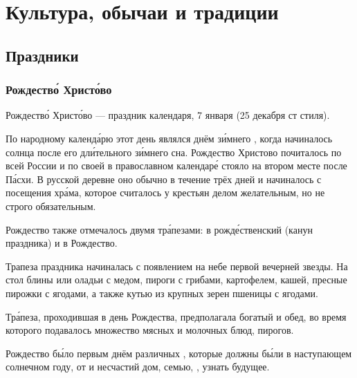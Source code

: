 \chapter{Культура, обычаи и традиции}

\section{Праздники}
\subsection{Рождеств\'{о} Христ\'{о}во}
Рождеств\'{о} Христ\'{о}во --- праздник  календаря,  7 января (25 декабря ст стиля).

По народному календ\'{а}рю этот день являлся днём з\'{и}мнего , когда начиналось  солнца после его дл\'{и}тельного з\'{и}мнего сна. Рождество Христово почиталось по всей России и по своей  в православном календар\'{е} стояло на втором месте после П\'{а}схи. В русской деревне оно  обычно в течение трёх дней и начиналось с посещения хр\'{а}ма, которое считалось у крестьян делом желательным, но не строго обязательным.

Рождество также отмечалось двумя тр\'{а}пезами: в рожд\'{е}ственский  (канун праздника) и  в Рождество.

Трапеза  праздника начиналась с появлением на небе первой вечерней звезды. На стол  блины или оладьи с медом,  пироги с грибами, картофелем, кашей, пресные пирожки с ягодами, а также кутью из крупных зерен пшеницы с ягодами.

Тр\'{а}пеза, проходившая в день Рождества, предполагала богатый и  обед, во время которого подавалось множество мясных и молочных блюд, пирогов.

Рождество б\'{ы}ло первым днём  различных , которые должны б\'{ы}ли   в наступающем солнечном году,  от  и несчастий дом, семью, , узнать будущее.

